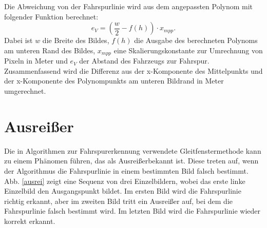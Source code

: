 \documentclass[arbeit=studie,oneside,BCOR=12mm]{ArbeitRST}
\begin{document}
Die Abweichung von der Fahrspurlinie wird aus dem angepassten Polynom mit
folgender Funktion berechnet: 
\begin{equation}
    e_{V} = (\frac{w}{2} - f(h))\cdot x_{mpp}.
\end{equation}
Dabei ist $w$ die Breite des Bildes, $f(h)$ die Ausgabe des berechneten
Polynoms am unteren Rand des Bildes, $x_{mpp}$ eine Skalierungskonstante zur
Umrechnung von Pixeln in Meter und $e_{V}$ der Abstand des Fahrzeugs zur
Fahrspur. Zusammenfassend wird die Differenz aus der x-Komponente des
Mittelpunkts und der x-Komponente des Polynompunkts am unteren Bildrand in
Meter umgerechnet.

\section{Ausrei{\ss}er}

Die in Algorithmen zur Fahrspurerkennung verwendete Gleitfenstermethode kann zu
einem Phänomen führen, das als \glqq Ausreißer\grqq bekannt ist. Diese treten auf, wenn
der Algorithmus die Fahrspurlinie in einem bestimmten Bild falsch bestimmt.
Abb. \ref{ausrei} zeigt eine Sequenz von drei Einzelbildern, wobei das erste linke
Einzelbild den Ausgangspunkt bildet. Im ersten Bild wird die Fahrspurlinie
richtig erkannt, aber im zweiten Bild tritt ein Ausreißer auf, bei dem die
Fahrspurlinie falsch bestimmt wird. Im letzten Bild wird die Fahrspurlinie
wieder korrekt erkannt.
\end{document}
